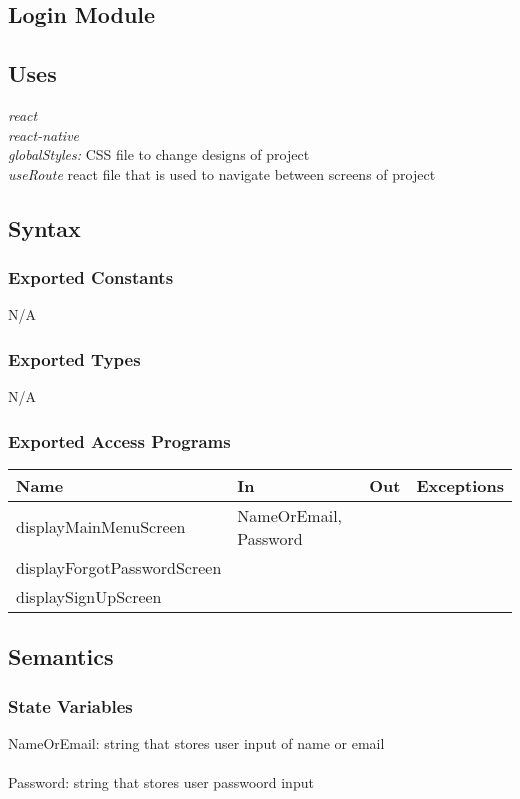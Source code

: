 \documentclass[12pt, titlepage]{article}
\begin{document}
\subsection{Login Module}

\subsection{Uses}
{\textit{react}}\\
{\textit{react-native}}\\
{\textit{globalStyles:} CSS file to change designs of project}\\
{\textit{useRoute} react file that is used to navigate between screens of project}

\subsection{Syntax}

\subsubsection{Exported Constants}
N/A

\subsubsection{Exported Types}
N/A

\subsubsection{Exported Access Programs}

\begin{tabular}{| l | l | l | l |}
	\hline
	{\textbf{Name}} & {\textbf{In}} & {\textbf{Out}} & {\textbf{Exceptions}}\\
	\hline
	{displayMainMenuScreen} & NameOrEmail, Password& & \\
	\hline
	{displayForgotPasswordScreen} & & & \\
	\hline
	{displaySignUpScreen} & & & \\
	\hline
\end{tabular}

\subsection{Semantics}

\subsubsection{State Variables}
NameOrEmail: string that stores user input of name or email\\\\
Password: string that stores user passwoord input
\end{document}
